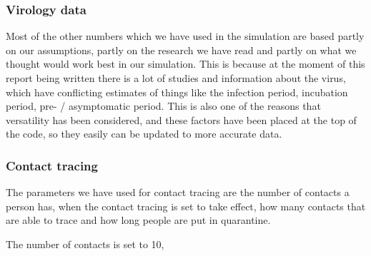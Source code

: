 \subsubsection{Virology data}
Most of the other numbers which we have used in the simulation are based partly on our assumptions, partly on the research we have read and partly on what we thought would work best in our simulation. This is because at the moment of this report being written there is a lot of studies and information about the virus, which have conflicting estimates of things like the infection period, incubation period, pre- / asymptomatic period. This is also one of the reasons that versatility has been considered, and these factors have been placed at the top of the code, so they easily can be updated to more accurate data.

\subsubsection{Contact tracing}
The parameters we have used for contact tracing are the number of contacts a person has, when the contact tracing is set to take effect, how many contacts that are able to trace and how long people are put in quarantine.

The number of contacts is set to 10, 









